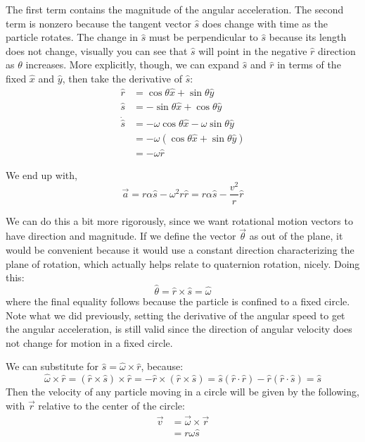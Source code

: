 \documentclass[10pt]{article}
\begin{document}
The first term contains the magnitude of the angular acceleration. The second 
term is nonzero because the tangent vector $\hat{s}$ does change with 
time as the particle rotates. The change in $\hat{s}$ must be 
perpendicular to $\hat{s}$ because its length does not change, visually 
you can see that $\hat{s}$ will point in the negative $\hat{r}$ direction 
as $\theta$ increases. More explicitly, though, we can expand $\hat{s}$ and 
$\hat{r}$ in terms of the fixed $\hat{x}$ and $\hat{y}$, then take 
the derivative of $\hat{s}$:
\begin{align*}
    \hat{r} &= \cos\theta\hat{x} + \sin\theta\hat{y} \\
    \hat{s} &= -\sin\theta\hat{x} + \cos\theta\hat{y} \\
    \dot{\hat{s}} &= -\omega\cos\theta\hat{x} - \omega\sin\theta\hat{y} \\
    &= -\omega(\cos\theta\hat{x} + \sin\theta\hat{y}) \\
    &= -\omega\hat{r}
\end{align*}

We end up with,
\begin{equation}
    \vec{a} = r\alpha\hat{s} - \omega^2r\hat{r} = r\alpha\hat{s} - 
        \frac{v^2}{r}\hat{r}
\end{equation}

We can do this a bit more rigorously, since we want rotational motion 
vectors to have direction and magnitude.
If we define the vector $\vec{\theta}$ as out of the plane, it would 
be convenient because it would use a constant direction characterizing the 
plane of rotation, which actually helps relate to quaternion rotation, nicely. 
Doing this:
\begin{equation}
    \hat{\theta} = \hat{r}\times\hat{s} = \hat{\omega}
\end{equation}
where the final equality follows because the particle is confined to 
a fixed circle. Note what we did previously, setting the derivative 
of the angular speed to get the angular acceleration, is still valid since 
the direction of angular velocity does not change for motion in a fixed 
circle. 

We can substitute for $\hat{s} = \hat{\omega}\times\hat{r}$, 
because:
\begin{equation}
    \hat{\omega}\times\hat{r} = (\hat{r}\times\hat{s})\times\hat{r} = 
        - \hat{r}\times(\hat{r}\times\hat{s}) = \hat{s}(\hat{r}\cdot\hat{r}) 
        - \hat{r}(\hat{r}\cdot\hat{s}) = \hat{s}
\end{equation}
Then the velocity of any particle moving in a circle will be given by the 
following, with $\vec{r}$ relative to the center of the circle:
\begin{align}
    \vec{v} &= \vec{\omega}\times\vec{r} \label{vomegar} \\
    &= r\omega\hat{s}
\end{align}
\end{document}
